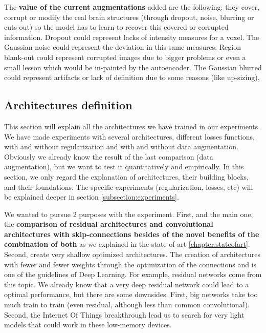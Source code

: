 

The \textbf{value of the current augmentations} added are the following: they cover, corrupt or modify the real brain structures (through dropout, noise, blurring or cuts-out) so the model has to learn to recover this covered or corrupted information. Dropout could represent lacks of  intensity measures for a voxel. The Gaussian noise could represent the deviation in this same measures. Region blank-out could represent corrupted images due to bigger problems or even a small lesson which would be in-painted by the autoencoder. The Gaussian blurred could represent artifacts or lack of definition due to some reasons (like up-sizing),

\subsection{Architectures definition}

This section will explain all the architectures we have trained in our experiments. We have made experiments with several architectures, different losses functions, with and without regularization and with and without data augmentation. Obviously we already know the result of the last comparison (data augmentation), but we want to test it quantitatively and empirically. In this section, we only regard the explanation of architectures, their building blocks, and their foundations. The specific experiments (regularization, losses, etc) will be explained deeper in section \ref{subsection:experiments}.

We wanted to pursue 2 purposes with the experiment. First, and the main one, the \textbf{comparison of residual architectures and convolutional architectures with skip-connections besides of the novel benefits of the combination of both} as we explained in the state of art \ref{chapter:stateofart}. Second, create very shallow optimized architectures. The creation of architectures with fewer and fewer weights through the optimization of the connections and is one of the guidelines of Deep Learning. For example, residual networks come from this topic. We already know that a very deep residual network could lead to a optimal performance, but there are some downsides. First, big networks take too much train to train (even residual, although less than common convolutional). Second, the Internet Of Things breakthrough lead us to search for very light models that could work in these low-memory devices.


